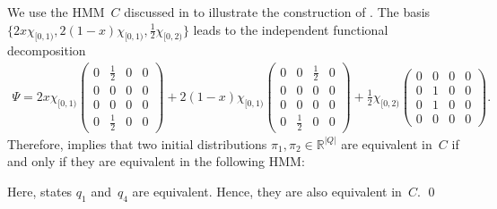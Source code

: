\documentclass[a4paper,UKenglish,cleveref, autoref,mathscr, amsthm, thmtools, thm-restate]{lipics-v2019}
\newcommand{\RR}{\mathbb{R}}
\newcommand{\1}{\mathbb{I}}
\begin{document}
\begin{example}\label{indfuncdecompex}
We use the HMM~$C$ discussed in  to illustrate the construction of .
The basis $\{2x\chi_{[0,1)}, 2(1-x)\chi_{[0,1)}, \frac12\chi_{[0,2)}\}$ leads to the independent functional decomposition
\begin{multline*}
\Psi = 2x\chi_{[0,1)}\begin{pmatrix}
0 & \frac12  & 0 & 0 \\
0 & 0 & 0 & 0 \\
0 & 0 & 0 & 0 \\
0 & \frac12 & 0 & 0
\end{pmatrix} + 2(1 - x)\chi_{[0,1)}\begin{pmatrix}
0 & 0  & \frac12 & 0 \\
0 & 0 & 0 & 0 \\
0 & 0 & 0 & 0 \\
0 & \frac12 & 0 & 0
\end{pmatrix} + \frac12 \chi_{[0,2)}\begin{pmatrix}
0 & 0  & 0 & 0 \\
0 & 1 & 0 & 0 \\
0 & 1 & 0 & 0 \\
0 & 0 & 0 & 0
\end{pmatrix}.
\end{multline*}
Therefore,  implies that two initial distributions $\pi_1, \pi_2 \in \RR^{|Q|}$ are equivalent in~$C$ if and only if they are equivalent in the following HMM:
\begin{center}
\end{center}
Here, states $q_1$ and~$q_4$ are equivalent.
Hence, they are also equivalent in~$C$.
\qed
\end{example}
\end{document}
